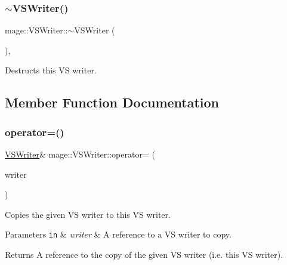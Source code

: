 \subsubsection{\texorpdfstring{$\sim$\+V\+S\+Writer()}{~VSWriter()}}
{\footnotesize\ttfamily mage\+::\+V\+S\+Writer\+::$\sim$\+V\+S\+Writer (\begin{DoxyParamCaption}{ }\end{DoxyParamCaption})\hspace{0.3cm}{\ttfamily [virtual]}, {\ttfamily [default]}}

Destructs this VS writer. 

\subsection{Member Function Documentation}
\hypertarget{classmage_1_1_v_s_writer_af943d317ae357723a08b2bbf2bab23ba}{}\label{classmage_1_1_v_s_writer_af943d317ae357723a08b2bbf2bab23ba} 
\subsubsection{\texorpdfstring{operator=()}{operator=()}\hspace{0.1cm}{\footnotesize\ttfamily [1/2]}}
{\footnotesize\ttfamily \hyperlink{classmage_1_1_v_s_writer}{V\+S\+Writer}\& mage\+::\+V\+S\+Writer\+::operator= (\begin{DoxyParamCaption}\item[{const \hyperlink{classmage_1_1_v_s_writer}{V\+S\+Writer} \&}]{writer }\end{DoxyParamCaption})\hspace{0.3cm}{\ttfamily [delete]}}

Copies the given VS writer to this VS writer.


\begin{DoxyParams}[1]{Parameters}
\mbox{\tt in}  & {\em writer} & A reference to a VS writer to copy. \\
\hline
\end{DoxyParams}
\begin{DoxyReturn}{Returns}
A reference to the copy of the given VS writer (i.\+e. this VS writer). 
\end{DoxyReturn}
\hypertarget{classmage_1_1_v_s_writer_af1dca5c791cfb62967cd2437f7db170a}{}\label{classmage_1_1_v_s_writer_af1dca5c791cfb62967cd2437f7db170a} 
